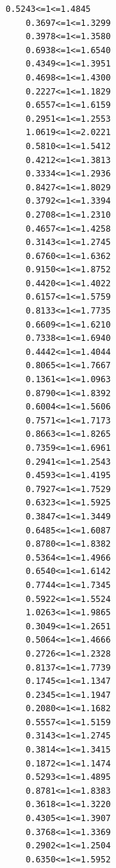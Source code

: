 \documentclass[a4paper, 12pt]{article}
\begin{document}
\begin{lstlisting}[label=res1000, caption={Доверительные интервалы при $n=1000$}]
    0.5243<=1<=1.4845
    0.3697<=1<=1.3299
    0.3978<=1<=1.3580
    0.6938<=1<=1.6540
    0.4349<=1<=1.3951
    0.4698<=1<=1.4300
    0.2227<=1<=1.1829
    0.6557<=1<=1.6159
    0.2951<=1<=1.2553
    1.0619<=1<=2.0221
    0.5810<=1<=1.5412
    0.4212<=1<=1.3813
    0.3334<=1<=1.2936
    0.8427<=1<=1.8029
    0.3792<=1<=1.3394
    0.2708<=1<=1.2310
    0.4657<=1<=1.4258
    0.3143<=1<=1.2745
    0.6760<=1<=1.6362
    0.9150<=1<=1.8752
    0.4420<=1<=1.4022
    0.6157<=1<=1.5759
    0.8133<=1<=1.7735
    0.6609<=1<=1.6210
    0.7338<=1<=1.6940
    0.4442<=1<=1.4044
    0.8065<=1<=1.7667
    0.1361<=1<=1.0963
    0.8790<=1<=1.8392
    0.6004<=1<=1.5606
    0.7571<=1<=1.7173
    0.8663<=1<=1.8265
    0.7359<=1<=1.6961
    0.2941<=1<=1.2543
    0.4593<=1<=1.4195
    0.7927<=1<=1.7529
    0.6323<=1<=1.5925
    0.3847<=1<=1.3449
    0.6485<=1<=1.6087
    0.8780<=1<=1.8382
    0.5364<=1<=1.4966
    0.6540<=1<=1.6142
    0.7744<=1<=1.7345
    0.5922<=1<=1.5524
    1.0263<=1<=1.9865
    0.3049<=1<=1.2651
    0.5064<=1<=1.4666
    0.2726<=1<=1.2328
    0.8137<=1<=1.7739
    0.1745<=1<=1.1347
    0.2345<=1<=1.1947
    0.2080<=1<=1.1682
    0.5557<=1<=1.5159
    0.3143<=1<=1.2745
    0.3814<=1<=1.3415
    0.1872<=1<=1.1474
    0.5293<=1<=1.4895
    0.8781<=1<=1.8383
    0.3618<=1<=1.3220
    0.4305<=1<=1.3907
    0.3768<=1<=1.3369
    0.2902<=1<=1.2504
    0.6350<=1<=1.5952
    \end{lstlisting}
\end{document}
